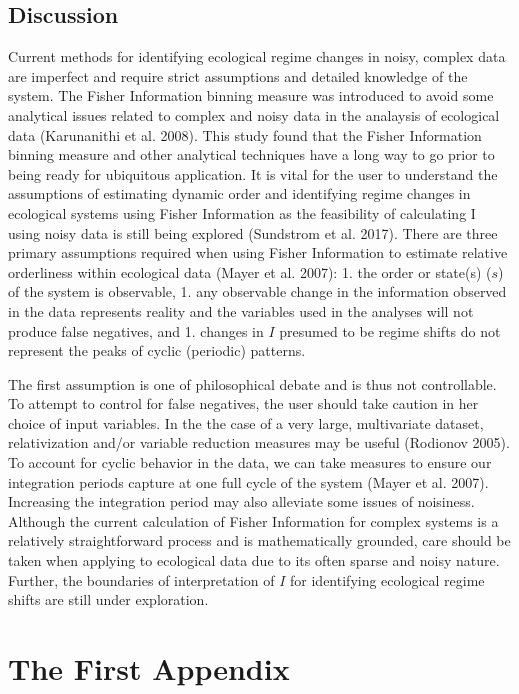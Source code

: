 \documentclass[12pt,twoside]{reedthesis}
\begin{document}
\section{Discussion}\label{discussion-1}

Current methods for identifying ecological regime changes in noisy,
complex data are imperfect and require strict assumptions and detailed
knowledge of the system. The Fisher Information binning measure was
introduced to avoid some analytical issues related to complex and noisy
data in the analaysis of ecological data (Karunanithi et al. 2008). This
study found that the Fisher Information binning measure and other
analytical techniques have a long way to go prior to being ready for
ubiquitous application. It is vital for the user to understand the
assumptions of estimating dynamic order and identifying regime changes
in ecological systems using Fisher Information as the feasibility of
calculating I using noisy data is still being explored (Sundstrom et al.
2017). There are three primary assumptions required when using Fisher
Information to estimate relative orderliness within ecological data
(Mayer et al. 2007): 1. the order or state(s) (\(s\)) of the system is
observable, 1. any observable change in the information observed in the
data represents reality and the variables used in the analyses will not
produce false negatives, and 1. changes in \(I\) presumed to be regime
shifts do not represent the peaks of cyclic (periodic) patterns.

The first assumption is one of philosophical debate and is thus not
controllable. To attempt to control for false negatives, the user should
take caution in her choice of input variables. In the the case of a very
large, multivariate dataset, relativization and/or variable reduction
measures may be useful (Rodionov 2005). To account for cyclic behavior
in the data, we can take measures to ensure our integration periods
capture at one full cycle of the system (Mayer et al. 2007). Increasing
the integration period may also alleviate some issues of noisiness.
Although the current calculation of Fisher Information for complex
systems is a relatively straightforward process and is mathematically
grounded, care should be taken when applying to ecological data due to
its often sparse and noisy nature. Further, the boundaries of
interpretation of \(I\) for identifying ecological regime shifts are
still under exploration.

\appendix

\chapter{The First Appendix}\label{the-first-appendix}
\end{document}
